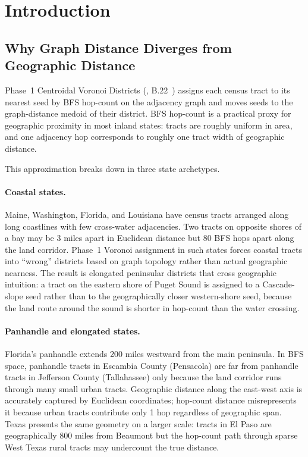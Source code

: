 \section{Introduction}
\label{sec:introduction}

\subsection{Why Graph Distance Diverges from Geographic Distance}

Phase~1 Centroidal Voronoi Districts (\cvd{}, B.22~\citep{dellaLibera2026cvd})
assigns each census tract to its nearest seed by BFS hop-count on the
adjacency graph and moves seeds to the graph-distance medoid of their district.
BFS hop-count is a practical proxy for geographic proximity in most inland
states: tracts are roughly uniform in area, and one adjacency hop corresponds
to roughly one tract width of geographic distance.

This approximation breaks down in three state archetypes.

\paragraph{Coastal states.}
Maine, Washington, Florida, and Louisiana have census tracts arranged along
long coastlines with few cross-water adjacencies.
Two tracts on opposite shores of a bay may be 3 miles apart in Euclidean
distance but 80 BFS hops apart along the land corridor.
Phase~1 Voronoi assignment in such states forces coastal tracts into ``wrong''
districts based on graph topology rather than actual geographic nearness.
The result is elongated peninsular districts that cross geographic intuition:
a tract on the eastern shore of Puget Sound is assigned to a Cascade-slope
seed rather than to the geographically closer western-shore seed, because
the land route around the sound is shorter in hop-count than the water
crossing.

\paragraph{Panhandle and elongated states.}
Florida's panhandle extends 200 miles westward from the main peninsula.
In BFS space, panhandle tracts in Escambia County (Pensacola) are far from
panhandle tracts in Jefferson County (Tallahassee) only because the land
corridor runs through many small urban tracts.
Geographic distance along the east-west axis is accurately captured by
Euclidean coordinates; hop-count distance misrepresents it because urban
tracts contribute only 1 hop regardless of geographic span.
Texas presents the same geometry on a larger scale: tracts in El Paso are
geographically 800 miles from Beaumont but the hop-count path through
sparse West Texas rural tracts may undercount the true distance.

